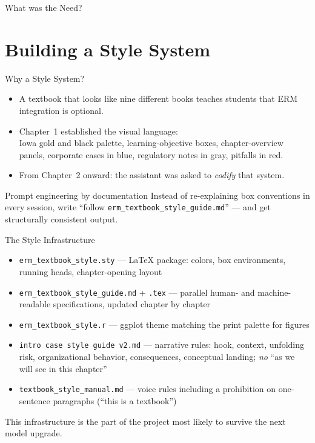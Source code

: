 \documentclass[11pt, aspectratio=169]{beamer}
\begin{document}
\begin{frame}{What was the Need?}
\section{Building a Style System}

\begin{frame}{Why a Style System?}
\begin{itemize}
  \item A textbook that looks like nine different books
        teaches students that ERM integration is optional.
  \item Chapter~1 established the visual language:\\
        \alert{Iowa gold and black palette}, learning-objective boxes,
        chapter-overview panels, corporate cases in blue, regulatory notes
        in gray, pitfalls in red.
  \item From Chapter~2 onward: the assistant was asked to \emph{codify} that system.
\end{itemize}
\medskip
\begin{block}{Prompt engineering by documentation}
Instead of re-explaining box conventions in every session, write
``follow \texttt{erm\_textbook\_style\_guide.md}'' --- and get structurally
consistent output.
\end{block}
\end{frame}

\begin{frame}{The Style Infrastructure}
\begin{itemize}
  \item \texttt{erm\_textbook\_style.sty} ---
        \LaTeX{} package: colors, box environments, running heads, chapter-opening layout
  \item \texttt{erm\_textbook\_style\_guide.md} + \texttt{.tex} ---
        parallel human- and machine-readable specifications, updated chapter by chapter
  \item \texttt{erm\_textbook\_style.r} ---
        ggplot theme matching the print palette for figures
  \item \texttt{intro case style guide v2.md} ---
        narrative rules: hook, context, unfolding risk, organizational behavior,
        consequences, conceptual landing; \emph{no} ``as we will see in this chapter''
  \item \texttt{textbook\_style\_manual.md} ---
        voice rules including a prohibition on one-sentence paragraphs
        (``this is a textbook'')
\end{itemize}
\medskip
\small This infrastructure is the part of the project most likely to survive
the next model upgrade.
\end{frame}


\end{frame}
\end{document}
